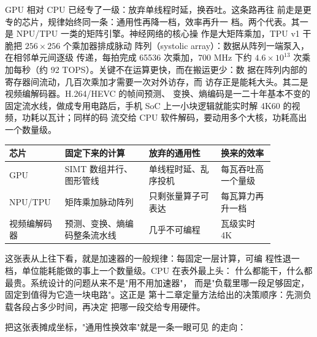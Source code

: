 GPU 相对 CPU 已经专了一级：放弃单线程时延，换吞吐。这条路再往
前走是更专的芯片，规律始终同一条：通用性再降一档，效率再升一
档。两个代表。其一是 NPU/TPU 一类的矩阵引擎。神经网络的核心操
作是大矩阵乘加，TPU v1 干脆把 $256\times256$ 个乘加器排成脉动
阵列（systolic array）：数据从阵列一端泵入，在相邻单元间逐级
传递，每拍完成 65536 次乘加，700 MHz 下约 $4.6\times10^{13}$
次乘加每秒（约 92 TOPS）。关键不在运算更快，而在搬运更少：数
据在阵列内部的寄存器间流动，几百次乘加才需要一次对外访存，而
访存正是能耗大头。其二是视频编解码器。H.264/HEVC 的帧间预测、
变换、熵编码是一二十年基本不变的固定流水线，做成专用电路后，手机
SoC 上一小块逻辑就能实时解 4K60 的视频，功耗以瓦计；同样的码
流交给 CPU 软件解码，要动用多个大核，功耗高出一个数量级。

\begin{longtable}{L{0.16\linewidth}L{0.28\linewidth}L{0.24\linewidth}L{0.18\linewidth}}
\toprule
芯片 & 固定下来的计算 & 放弃的通用性 & 换来的效率 \\
\midrule
GPU & SIMT 数组并行、图形管线 & 单线程时延、乱序投机 & 每瓦吞吐高一个量级 \\
NPU/TPU & 矩阵乘加脉动阵列 & 只剩张量算子可表达 & 每瓦算力再升一档 \\
视频编解码器 & 预测、变换、熵编码整条流水线 & 几乎不可编程 & 瓦级实时 4K \\
\bottomrule
\end{longtable}

这张表从上往下看，就是加速器的一般规律：每固定一层计算，可编
程性退一档，单位能耗能做的事上一个数量级。CPU 在表外最上头：
什么都能干，什么都最贵。系统设计的问题从来不是"用不用加速器"，
而是"负载里哪一段足够固定，固定到值得为它造一块电路"。这正是
第十二章定量方法给出的决策顺序：先测负载各段占多少时间，再决定
把哪一段交给专用硬件。

把这张表摊成坐标，"通用性换效率"就是一条一眼可见
的走向：

